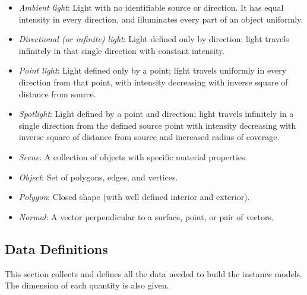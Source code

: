 \documentclass[12pt]{article}
\begin{document}
\begin{itemize}
\item[\label{}] \textit{Ambient light}: Light with no identifiable source or 
direction. It has equal intensity in every direction, and illuminates every 
part of an object uniformly.
\item[\label{}] \textit{Directional (or infinite) light}: Light defined only by 
direction; light travels infinitely in that single direction with constant 
intensity. 
\item[\label{}] \textit{Point light}: Light defined only by a point; light 
travels uniformly in every direction from that point, with intensity decreasing 
with inverse square of distance from source. 
\item[\label{}] \textit{Spotlight}: Light defined by a point and direction; 
light travels infinitely in a single direction from the defined source point 
with intensity decreasing with inverse square of distance from source and 
increased radius of coverage.
\item[\label{}] \textit{Scene}: A collection of objects with specific material 
properties. 
\item[\label{}] \textit{Object}: Set of polygons, edges, and vertices. 
\item[\label{}] \textit{Polygon}: Closed shape (with well defined interior and 
exterior).
\item[\label{}] \textit{Normal}: A vector perpendicular to a surface, point, or 
pair of 
vectors.

\end{itemize}

\subsection{Data Definitions} \label{sec_datadef}
This section collects and defines all the data needed to build the instance
models. The dimension of each quantity is also given.

~\newline
\end{document}
